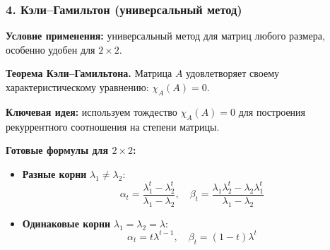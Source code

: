 \subsubsection*{4. Кэли–Гамильтон (универсальный метод)}

\textbf{Условие применения:} универсальный метод для матриц любого размера, особенно удобен для $2 \times 2$.

\textbf{Теорема Кэли–Гамильтона.} Матрица $A$ удовлетворяет своему характеристическому уравнению: $\chi_A(A) = 0$.

\textbf{Ключевая идея:} используем тождество $\chi_A(A) = 0$ для построения рекуррентного соотношения на степени матрицы.

\begin{center}
\end{center}

\textbf{Готовые формулы для $2 \times 2$:}
\begin{itemize}
\item \textbf{Разные корни} $\lambda_1 \neq \lambda_2$:
\[
\alpha_t = \frac{\lambda_1^t - \lambda_2^t}{\lambda_1 - \lambda_2}, \quad \beta_t = \frac{\lambda_1\lambda_2^t - \lambda_2\lambda_1^t}{\lambda_1 - \lambda_2}
\]
\item \textbf{Одинаковые корни} $\lambda_1 = \lambda_2 = \lambda$:
\[
\alpha_t = t\lambda^{t-1}, \quad \beta_t = (1-t)\lambda^t
\]
\end{itemize}

